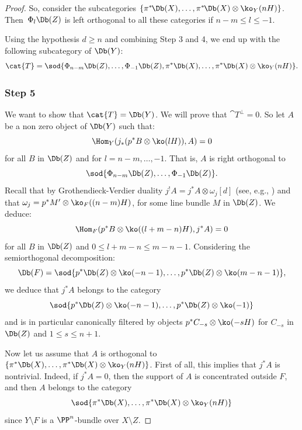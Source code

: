 \begin{proof}
So, consider the subcategories $\{ \pi^*\mkern-2mu \Db(X),\ldots, \pi^* \mkern-2mu\Db(X)\otimes \ko_Y(nH)\}$. Then~$\Phi_l \Db(Z)$ is left orthogonal to all these categories if
$n-m \leq l \leq -1$.

Using the hypothesis $d \geq n$ and combining Step 3 and 4,
we end up with the following subcategory of $\Db(Y)$:
\[
\cat{T}=\sod{\Phi_{n-m}\Db(Z),\ldots,\Phi_{-1}\Db(Z),\pi^*\Db(X),\ldots,\pi^*\Db(X)\otimes \ko_Y(nH)}.
\]

\subsubsection*{Step 5}
We want to show that $\cat{T}=\Db(Y)$. We will prove that $\cat{T}^\perp=0$. So let $A$ be a non zero object of $\Db(Y)$ such that:\vspace*{-3pt}
\begin{equation*}\label{eq:orthogonal-to-PHIl}
\Hom_Y(j_*(p^* B \otimes \ko(lH)),A)=0
\end{equation*}
for all $B$ in $\Db(Z)$ and for $l=n-m,\ldots,-1$. That is, $A$ is right orthogonal to\vspace*{-3pt}
\[
\sod{\Phi_{n-m}\Db(Z),\ldots,\Phi_{-1}\Db(Z)}.
\]
Recall that by Grothendieck-Verdier duality $j^!A=j^*A \otimes \omega_j [d]$ (see, e.g., \cite[Cor.\,3.38]{Huybook}) and that
$\omega_j = p^*M' \otimes \ko_F((n-m)H)$, for some
line bundle $M$ in $\Db(Z)$.
We deduce:\vspace*{-3pt}
\[
\Hom_F(p^*B \otimes \ko((l+m-n)H),j^*A)= 0
\]
for all $B$ in $\Db(Z)$ and $0 \leq l+m-n \leq m-n-1$. Considering the semiorthogonal decomposition:\vspace*{-3pt}
\[
\Db(F) =\sod{p^*\Db(Z)\otimes \ko(-n-1),\ldots,p^*\Db(Z)\otimes \ko(m-n-1)},
\]
we deduce that $j^*A$ belongs to the category\vspace*{-3pt}
\[
\sod{p^*\Db(Z)\otimes \ko(-n-1),\ldots,p^*\Db(Z)\otimes \ko(-1)}
\]
and is in particular canonically filtered by objects $p^*C_{-s} \otimes \ko(-sH)$ for
$C_{-s}$ in $\Db(Z)$ and $1 \leq s \leq n+1$.

Now let us assume that $A$ is orthogonal to $\{\pi^*\Db(X),\ldots,\pi^*\Db(X)\otimes \ko_Y(nH)\}$.
First of all, this implies that $j^*A$ is nontrivial. Indeed, if $j^*A = 0$, then the support of $A$
is concentrated outside $F$, and then $A$ belongs to
the category\vspace*{-3pt}
\[
\sod{\pi^*\Db(X),\ldots,\pi^*\Db(X)\otimes \ko_Y(nH)}
\]
since $Y \setminus F$ is a $\PP^n$-bundle over $X \setminus Z$.


\end{proof}
